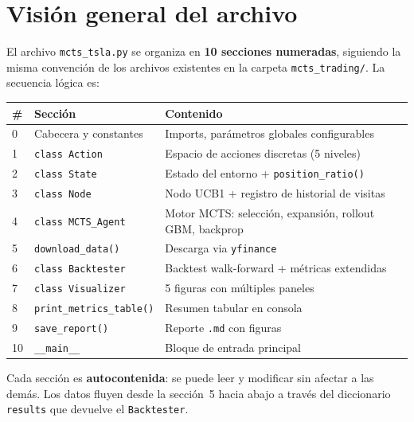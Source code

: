 \documentclass[12pt, a4paper]{article}
\begin{document}
\section{Visión general del archivo}

El archivo \texttt{mcts\_tsla.py} se organiza en \textbf{10 secciones numeradas},
siguiendo la misma convención de los archivos existentes en la carpeta
\texttt{mcts\_trading/}. La secuencia lógica es:

\begin{center}
\renewcommand{\arraystretch}{1.3}
\begin{tabular}{C{0.5cm} L{3.8cm} L{9cm}}
\toprule
\textbf{\#} & \textbf{Sección} & \textbf{Contenido} \\
 & Cabecera y constantes & Imports, parámetros globales configurables \\
1 & \texttt{class Action} & Espacio de acciones discretas (5 niveles) \\
2 & \texttt{class State} & Estado del entorno + \texttt{position\_ratio()} \\
3 & \texttt{class Node} & Nodo UCB1 + registro de historial de visitas \\
4 & \texttt{class MCTS\_Agent} & Motor MCTS: selección, expansión, rollout GBM, backprop \\
5 & \texttt{download\_data()} & Descarga via \texttt{yfinance} \\
6 & \texttt{class Backtester} & Backtest walk-forward + métricas extendidas \\
7 & \texttt{class Visualizer} & 5 figuras con múltiples paneles \\
8 & \texttt{print\_metrics\_table()} & Resumen tabular en consola \\
9 & \texttt{save\_report()} & Reporte \texttt{.md} con figuras \\
10 & \texttt{\_\_main\_\_} & Bloque de entrada principal \\
\bottomrule
\end{tabular}
\end{center}

\begin{tcolorbox}[clave]
  Cada sección es \textbf{autocontenida}: se puede leer y modificar sin afectar
  a las demás. Los datos fluyen desde la sección~5 hacia abajo a través del
  diccionario \texttt{results} que devuelve el \texttt{Backtester}.
\end{tcolorbox}
\end{document}
